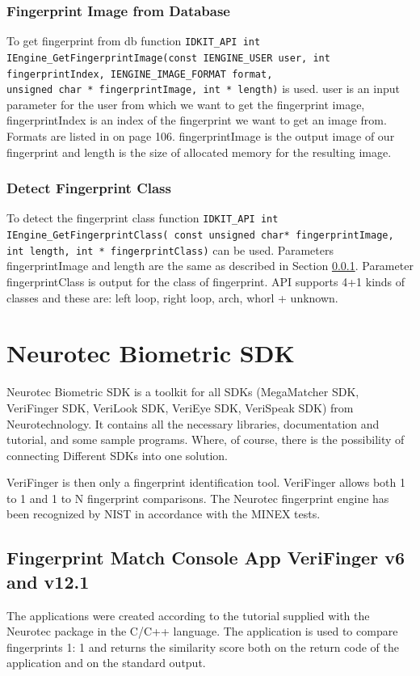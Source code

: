 \subsubsection{Fingerprint Image from Database}
\label{ffdb}
To get fingerprint from db function \texttt{IDKIT\_API int IEngine\_GetFingerprintImage(const IENGINE\_USER user, int fingerprintIndex,
IENGINE\_IMAGE\_FORMAT format, \\ unsigned char * fingerprintImage, int * length)} is used. user is an input parameter for the user from which we want to get the fingerprint image, fingerprintIndex is an index of the fingerprint we want to get an image from. Formats are listed in \cite{idkitsdk} on page 106. fingerprintImage is the output image of our fingerprint and length is the size of allocated memory for the resulting image.

\subsubsection{Detect Fingerprint Class}
To detect the fingerprint class function \texttt{IDKIT\_API int IEngine\_GetFingerprintClass( const unsigned char* fingerprintImage, int
length, int * fingerprintClass)} can be used. Parameters fingerprintImage and length are the same as described in Section \ref{ffdb}. Parameter fingerprintClass is output for the class of fingerprint. API supports 4+1 kinds of classes and these are: left loop, right loop, arch, whorl + unknown.  

\section{Neurotec Biometric SDK}
Neurotec Biometric SDK is a toolkit for all SDKs (MegaMatcher SDK, VeriFinger SDK, VeriLook SDK, VeriEye SDK, VeriSpeak SDK) from Neurotechnology. It contains all the necessary libraries, documentation and tutorial, and some sample programs. Where, of course, there is the possibility of connecting Different SDKs into one solution. \cite{veri6}

VeriFinger is then only a fingerprint identification tool. VeriFinger allows both 1 to 1 and 1 to N fingerprint comparisons. The Neurotec fingerprint engine has been recognized by NIST in accordance with the MINEX tests. \cite{veri6}

\subsection{Fingerprint Match Console App VeriFinger v6 and v12.1}
The applications were created according to the tutorial supplied with the Neurotec package in the C/C++ language. The application is used to compare fingerprints 1: 1 and returns the similarity score both on the return code of the application and on the standard output. 

